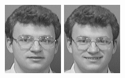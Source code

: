 \begin{figure}[ht]
 \includegraphics[width=\columnwidth/11]{ch3/figures/s6_1.png}
 \includegraphics[width=\columnwidth/11]{ch3/figures/s6_2.png}

\end{figure}
